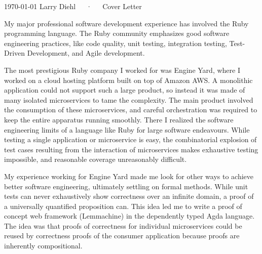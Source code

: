 \documentclass[11pt, a4paper]{awesome-cv}
\begin{document}
\makecvheader

\makecvfooter
  {\today}
  {Larry Diehl~~~·~~~Cover Letter}
  {}

\makelettertitle

\begin{cvletter}


My major professional software development experience has involved the
Ruby programming language.
The Ruby community emphasizes good software engineering practices,
like code quality, unit testing, integration testing, Test-Driven
Development, and Agile development.

The most prestigious Ruby company I worked for was Engine Yard,
where I worked on a cloud hosting platform built
on top of Amazon AWS. A monolithic application could not support such
a large product, so instead it was made of many isolated microservices
to tame the complexity. The main product involved the consumption of
these microservices, and careful orchestration was required to keep the
entire apparatus running smoothly. There I
realized the software engineering limits of a language like
Ruby for large software endeavours. While testing a single application
or microservice is easy, the combinatorial explosion of test cases
resulting from the interaction of microservices makes exhaustive
testing impossible, and reasonable coverage unreasonably difficult.


My experience working for Engine Yard made me look for other ways to
achieve better software engineering, ultimately settling on formal
methods. While unit tests can never exhaustively show correctness over
an infinite domain, a proof of a universally quantified proposition
can. This idea led me to write a proof of concept web framework
(Lemmachine) in the dependently typed Agda language. The idea was that
proofs of correctness for individual microservices could be reused by
correctness proofs of the consumer application because proofs are inherently
compositional.


\end{cvletter}
\end{document}
